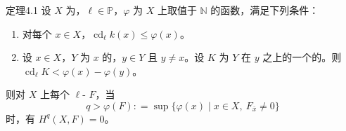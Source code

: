 \begin{SGAresult}{定理}{4.1}
设 $X$ 为，$\ell\in\mathbb P$，$\varphi$ 为 $X$ 上取值于 $\mathbb N$ 的函数，满足下列条件：
\begin{enumerate}
\item[(i)] 对每个 $x\in X$，$\operatorname{cd}_\ell k(x)\leq\varphi(x)$。
\item[(ii)] 设 $x\in X$，$Y$ 为 $x$ 的，$y\in Y$ 且 $y\ne x$。设 $K$ 为 $Y$ 在 $y$ 之上的一个的。则 $\operatorname{cd}_\ell K<\varphi(x)-\varphi(y)$。
\end{enumerate}
则对 $X$ 上每个 $\ell$- $F$，当
\[
 q>\varphi(F)\mathrel{\mathop:}=\sup\{\varphi(x)\mid x\in X,\ F_{\bar x}\ne0\}
\]
时，有 $H^q(X,F)=0$。
\end{SGAresult}
